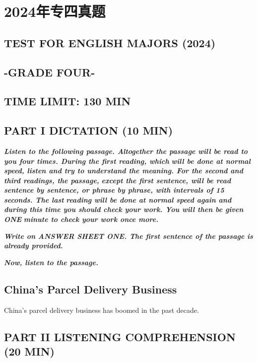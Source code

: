 \documentclass[UTF8,11pt]{ctexart}
\begin{document}
\section*{2024年专四真题}
\subsection*{\textbf{TEST} \textbf{FOR} \textbf{ENGLISH} \textbf{MAJORS (2024)}}


\subsection*{\textbf{-GRADE FOUR-}}


\subsection*{\textbf{TIME LIMIT: 130 MIN}}


\subsection*{\textbf{PART I DICTATION (10 MIN)}}


\textbf{\textit{Listen to the following passage. Altogether the passage will be read to you four times. During the first reading, which}} \textbf{\textit{will be done at normal speed, listen and try to understand the meaning. For the second and third readings, the passage,}} \textbf{\textit{except the first sentence, will be read sentence by sentence, or phrase by phrase, with intervals of 15 seconds. The last}} \textbf{\textit{reading will be done at normal speed again and during this time you should check your work. You will then be given ONE}} \textbf{\textit{minute to check your work once more.}}


\textbf{\textit{Write on ANSWER SHEET ONE. The first sentence of the passage is already provided.}}


\textbf{\textit{Now, listen to the passage.}}


\subsection*{\textbf{China’s Parcel Delivery Business}}


China’s parcel delivery business has boomed in the past decade.


\subsection*{\textbf{PART II LISTENING COMPREHENSION (20 MIN)}}
\end{document}
